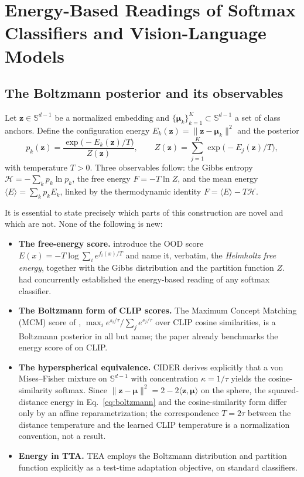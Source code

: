 \documentclass[preprint,12pt]{elsarticle}
\newcommand{\bz}{\mathbf{z}}
\newcommand{\bmu}{\boldsymbol{\mu}}
\begin{document}
\section{Energy-Based Readings of Softmax Classifiers and Vision-Language Models}
\label{sec:energy}

\subsection{The Boltzmann posterior and its observables}

Let $\bz \in \mathbb{S}^{d-1}$ be a normalized embedding and $\{\bmu_k\}_{k=1}^{K} \subset \mathbb{S}^{d-1}$ a set of class anchors. Define the configuration energy $E_k(\bz) = \lVert \bz - \bmu_k \rVert^2$ and the posterior
\begin{equation}
p_k(\bz) = \frac{\exp\!\big(-E_k(\bz)/T\big)}{Z(\bz)}, \qquad
Z(\bz) = \sum_{j=1}^{K} \exp\!\big(-E_j(\bz)/T\big),
\label{eq:boltzmann}
\end{equation}
with temperature $T > 0$. Three observables follow: the Gibbs entropy $\mathcal{H} = -\sum_k p_k \ln p_k$, the free energy $F = -T \ln Z$, and the mean energy $\langle E \rangle = \sum_k p_k E_k$, linked by the thermodynamic identity $F = \langle E \rangle - T\mathcal{H}$.

It is essential to state precisely which parts of this construction are novel and which are not. None of the following is new:

\begin{itemize}
\item \textbf{The free-energy score.} \citet{liu2020energy} introduce the OOD score $E(x) = -T \log \sum_i e^{f_i(x)/T}$ and name it, verbatim, the \emph{Helmholtz free energy}, together with the Gibbs distribution and the partition function $Z$. \citet{grathwohl2020jem} had concurrently established the energy-based reading of any softmax classifier.
\item \textbf{The Boltzmann form of CLIP scores.} The Maximum Concept Matching (MCM) score of \citet{ming2022mcm}, $\max_i e^{s_i/\tau} / \sum_j e^{s_j/\tau}$ over CLIP cosine similarities, is a Boltzmann posterior in all but name; the paper already benchmarks the energy score of \citet{liu2020energy} on CLIP.
\item \textbf{The hyperspherical equivalence.} CIDER \citep{ming2023cider} derives explicitly that a von Mises--Fisher mixture on $\mathbb{S}^{d-1}$ with concentration $\kappa = 1/\tau$ yields the cosine-similarity softmax. Since $\lVert \bz - \bmu \rVert^2 = 2 - 2\langle \bz, \bmu\rangle$ on the sphere, the squared-distance energy in Eq.~\eqref{eq:boltzmann} and the cosine-similarity form differ only by an affine reparametrization; the correspondence $T = 2\tau$ between the distance temperature and the learned CLIP temperature is a normalization convention, not a result.
\item \textbf{Energy in TTA.} TEA \citep{yuan2024tea} employs the Boltzmann distribution and partition function explicitly as a test-time adaptation objective, on standard classifiers.
\end{itemize}
\end{document}
